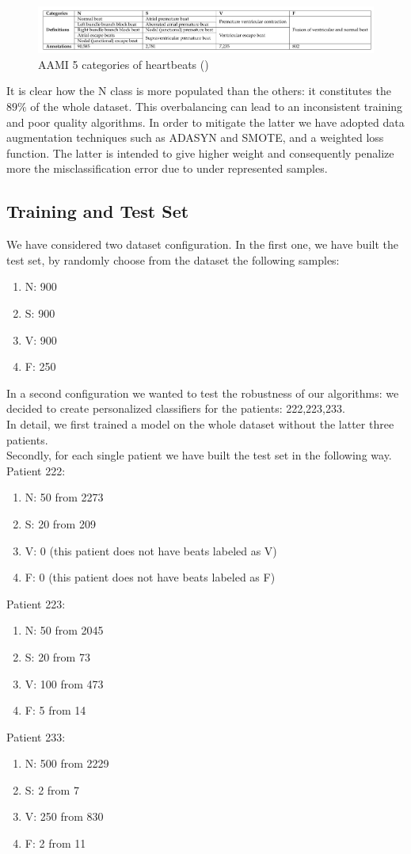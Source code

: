 \documentclass[LaM,binding=0.6cm]{sapthesis}
\begin{document}
\begin{figure}[H]  \centering
	\includegraphics[width=150mm,scale=0.7]{aamiimg}
	\caption{AAMI 5 categories of heartbeats  (\cite{aamistd})}
	\label{fig:aamiimg}
\end{figure}
It is clear how the N class is more populated than the others: it constitutes the $89\%$ of the whole dataset. This overbalancing can lead to an inconsistent training and poor quality algorithms. In order to mitigate the latter we have adopted data augmentation techniques such as ADASYN and SMOTE, and a weighted loss function. The latter is intended to give higher weight and consequently penalize more the misclassification error due to under represented samples.


\subsection{Training and Test Set}
We have considered two dataset configuration. In the first one, we have built the test set, by randomly choose from the dataset the following samples:
\begin{enumerate}
\item N: 900
\item S: 900
\item V: 900
\item F: 250
\end{enumerate}
In a second configuration we wanted to test the robustness of our algorithms: we decided to create personalized classifiers for the patients: 222,223,233.\\In detail, we first trained a model on the whole dataset without the latter three patients.\\Secondly, for each single patient we have built the test set in the following way.\\Patient 222:
\begin{enumerate}
\item N: 50 from 2273
\item S: 20 from 209
\item V: 0 (this patient does not have beats labeled as V)
\item F: 0 (this patient does not have beats labeled as F)
\end{enumerate}
Patient 223:
\begin{enumerate}
\item N: 50 from 2045
\item S: 20 from 73
\item V: 100 from 473
\item F: 5 from 14
\end{enumerate}
Patient 233:
\begin{enumerate}
\item N: 500 from 2229
\item S: 2 from 7
\item V: 250 from 830
\item F: 2 from 11
\end{enumerate}
\end{document}

